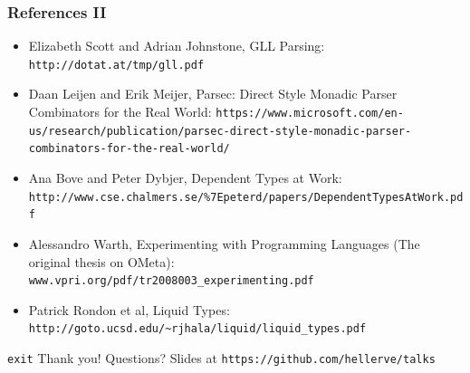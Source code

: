 \documentclass[aspectratio=169]{beamer}
\begin{document}
  \begin{frame}[fragile]
    \frametitle{References II}
    \begin{itemize}
      \item Elizabeth Scott and Adrian Johnstone, GLL Parsing: \texttt{http://dotat.at/tmp/gll.pdf}
      \item Daan Leijen and Erik Meijer, Parsec: Direct Style Monadic Parser Combinators for the Real World: \texttt{https://www.microsoft.com/en-us/research/publication/parsec-direct-style-monadic-parser-combinators-for-the-real-world/}
      \item Ana Bove and Peter Dybjer, Dependent Types at Work: \texttt{http://www.cse.chalmers.se/\%7Epeterd/papers/DependentTypesAtWork.pdf}
      \item Alessandro Warth, Experimenting with Programming Languages (The original thesis on OMeta): \texttt{www.vpri.org/pdf/tr2008003\_experimenting.pdf}
      \item Patrick Rondon et al, Liquid Types: \texttt{http://goto.ucsd.edu/\textasciitilde rjhala/liquid/liquid\_types.pdf}
    \end{itemize}
  \end{frame}
  \begin{frame}{\texttt{exit}}
    \Huge Thank you!
    \linebreak
    \linebreak
    \linebreak
    \small Questions?
    \linebreak
    \linebreak
    \tiny Slides at \texttt{https://github.com/hellerve/talks}
  \end{frame}
\end{document}
